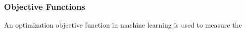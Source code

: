 \subsubsection{Objective Functions}
An optimization objective function in machine learning is used to measure the